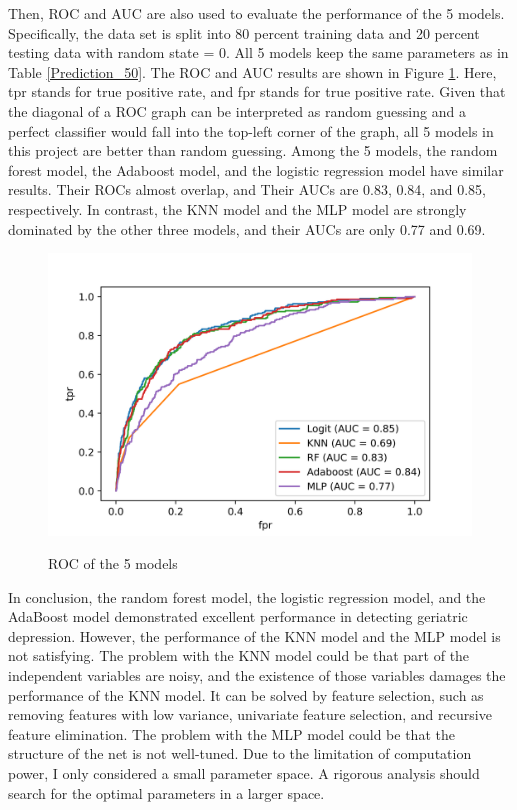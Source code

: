 \documentclass[12pt]{article}
\begin{document}
\par Then, ROC and AUC are also used to evaluate the performance of the 5 models. Specifically, the data set is split into 80 percent training data and 20 percent testing data with random state = 0. All 5 models keep the same parameters as in Table \ref{Prediction_50}. The ROC and AUC results are shown in Figure \ref{ROC_All}. Here, tpr stands for true positive rate, and fpr stands for true positive rate. Given that the diagonal of a ROC graph can be interpreted as random guessing and a perfect classifier would fall into the top-left corner of the graph, all 5 models in this project are better than random guessing. Among the 5 models, the random forest model, the Adaboost model, and the logistic regression model have similar results. Their ROCs almost overlap, and Their AUCs are 0.83, 0.84, and 0.85, respectively. In contrast, the KNN model and the MLP model are strongly dominated by the other three models, and their AUCs are only 0.77 and 0.69.

\begin{figure}[htbp]
\centering
\includegraphics[width=6in]{Pic/ROC_All.png}
\caption{ROC of the 5 models}\label{ROC_All}
\begin{flushleft}{
}\end{flushleft}
\end{figure}

\par In conclusion, the random forest model, the logistic regression model, and the AdaBoost model demonstrated excellent performance in detecting geriatric depression. However, the performance of the KNN model and the MLP model is not satisfying. The problem with the KNN model could be that part of the independent variables are noisy, and the existence of those variables damages the performance of the KNN model. It can be solved by feature selection, such as removing features with low variance, univariate feature selection, and  recursive feature elimination. The problem with the MLP model could be that the structure of the net is not well-tuned. Due to the limitation of computation power, I only considered a small parameter space. A rigorous analysis should search for the optimal parameters in a larger space.
\end{document}
